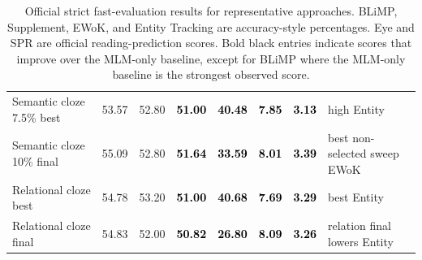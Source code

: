 \begin{table}[t]
\begin{tabularx}{\textwidth}{lrrrrrrX}
Semantic cloze 7.5\% best & 53.57 & 52.80 & \textcolor{black}{\textbf{51.00}} & \textcolor{black}{\textbf{40.48}} & \textcolor{black}{\textbf{7.85}} & \textcolor{black}{\textbf{3.13}} & high Entity \\
\rowcolor{tablegray} Semantic cloze 10\% final & 55.09 & 52.80 & \textcolor{black}{\textbf{51.64}} & \textcolor{black}{\textbf{33.59}} & \textcolor{black}{\textbf{8.01}} & \textcolor{black}{\textbf{3.39}} & best non-selected sweep EWoK \\
Relational cloze best & 54.78 & 53.20 & \textcolor{black}{\textbf{51.00}} & \textcolor{black}{\textbf{40.68}} & \textcolor{black}{\textbf{7.69}} & \textcolor{black}{\textbf{3.29}} & best Entity \\
\rowcolor{tablegray} Relational cloze final & 54.83 & 52.00 & \textcolor{black}{\textbf{50.82}} & \textcolor{black}{\textbf{26.80}} & \textcolor{black}{\textbf{8.09}} & \textcolor{black}{\textbf{3.26}} & relation final lowers Entity \\
\bottomrule
\end{tabularx}
\caption{Official strict fast-evaluation results for representative approaches. BLiMP, Supplement, EWoK, and Entity Tracking are accuracy-style percentages. Eye and SPR are official reading-prediction scores. Bold black entries indicate scores that improve over the MLM-only baseline, except for BLiMP where the MLM-only baseline is the strongest observed score.}
\label{tab:main-results}
\end{table}
